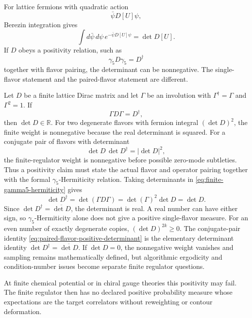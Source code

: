 For lattice fermions with quadratic action
\[
  \bar\psi D[U]\psi ,
\]
Berezin integration gives
\[
  \int d\bar\psi\,d\psi\,e^{-\bar\psi D[U]\psi}
  =
  \det D[U].
\]
If \(D\) obeys a positivity relation, such as
\[
  \gamma_5D\gamma_5=D^\dagger
\]
together with flavor pairing, the determinant can be nonnegative.  The
single-flavor statement and the paired-flavor statement are different.

\begin{remark}
\label{rem:gamma5-hermiticity-determinant-positivity}
Let \(D\) be a finite lattice Dirac matrix and let \(\Gamma\) be an
involution with \(\Gamma^\dagger=\Gamma\) and \(\Gamma^2=1\).  If
\begin{equation}
  \Gamma D\Gamma=D^\dagger ,
  \label{eq:finite-gamma5-hermiticity}
\end{equation}
then \(\det D\in\mathbb R\).  For two degenerate flavors with fermion
integral \((\det D)^2\), the finite weight is nonnegative because the real
determinant is squared.  For a conjugate pair of flavors with determinant
\begin{equation}
  \det D\,\det D^\dagger=|\det D|^2,
  \label{eq:paired-flavor-positive-determinant}
\end{equation}
the finite-regulator weight is nonnegative before possible zero-mode
subtleties.  Thus a positivity claim must state the actual flavor and
operator pairing together with the formal \(\gamma_5\)-Hermiticity relation.
Taking determinants in \eqref{eq:finite-gamma5-hermiticity} gives
\[
  \det D^\dagger
  =
  \det(\Gamma D\Gamma)
  =
  \det(\Gamma)^2\det D
  =
  \det D .
\]
Since \(\det D^\dagger=\overline{\det D}\), the determinant is real.  A real
number can have either sign, so \(\gamma_5\)-Hermiticity alone does not give
a positive single-flavor measure.  For an even number of exactly degenerate
copies, \((\det D)^{2k}\geq0\).  The conjugate-pair identity
\eqref{eq:paired-flavor-positive-determinant} is the elementary determinant
identity \(\det D^\dagger=\overline{\det D}\).  If \(\det D=0\), the
nonnegative weight vanishes and sampling remains mathematically defined, but
algorithmic ergodicity and condition-number issues become separate finite
regulator questions.
\end{remark}

At finite chemical potential or in chiral gauge theories this positivity may
fail.  The finite regulator then has no declared positive probability measure
whose expectations are the target correlators without reweighting or contour
deformation.

